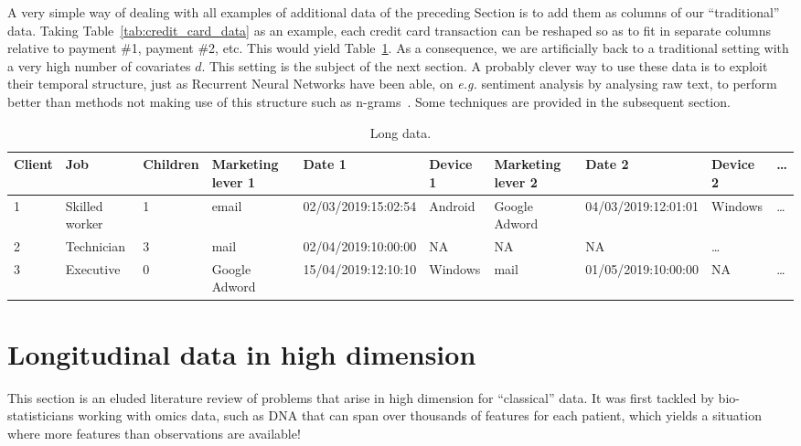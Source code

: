 A very simple way of dealing with all examples of additional data of the preceding Section is to add them as columns of our ``traditional'' data. Taking Table~\ref{tab:credit_card_data} as an example, each credit card transaction can be reshaped so as to fit in separate columns relative to payment \#1, payment \#2, etc. This would yield Table~\ref{tab:example_longitudinal}. As a consequence, we are artificially back to a traditional setting with a very high number of covariates $d$. This setting is the subject of the next section. A probably clever way to use these data is to exploit their temporal structure, just as Recurrent Neural Networks have been able, on \textit{e.g.} sentiment analysis by analysing raw text, to perform better than methods not making use of this structure such as n-grams~\cite{manning1999foundations}. Some techniques are provided in the subsequent section.



\begin{table}[ht]
    \centering
    \caption{Long data.}
    \label{tab:example_longitudinal}
    \begin{tiny}
\begin{tabular}{llllllllll}
Client & Job & Children & Marketing lever 1 & Date 1 & Device 1 & Marketing lever 2 & Date 2 & Device 2 & \dots \\
 \hline
1 & Skilled worker & 1 & email & 02/03/2019:15:02:54 & Android & Google Adword & 04/03/2019:12:01:01 & Windows & \dots \\
2 & Technician & 3 & mail & 02/04/2019:10:00:00 & NA & NA & NA & \dots\\
3 & Executive & 0 & Google Adword & 15/04/2019:12:10:10 & Windows & mail & 01/05/2019:10:00:00 & NA & \dots \\
\end{tabular}
    \end{tiny}
\end{table}


\section{Longitudinal data in high dimension}

This section is an eluded literature review of problems that arise in high dimension for ``classical'' data. It was first tackled by bio-statisticians working with omics data, such as DNA that can span over thousands of features for each patient, which yields a situation where more features than observations are available!

